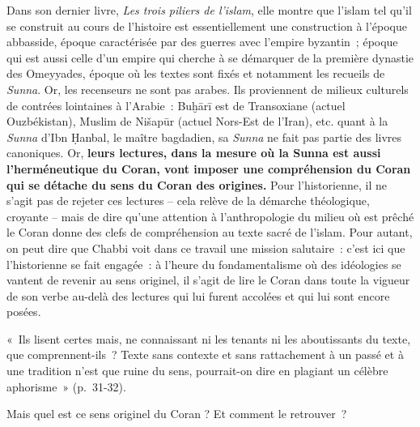 Dans son dernier livre, \emph{Les trois piliers de l'islam}, elle montre
que l'islam tel qu'il se construit au cours de l'histoire est
essentiellement une construction à l'époque abbasside, époque
caractérisée par des guerres avec l'empire byzantin~; époque qui est
aussi celle d'un empire qui cherche à se démarquer de la première
dynastie des Omeyyades, époque où les textes sont fixés et notamment les
recueils de \emph{Sunna}. Or, les recenseurs ne sont pas arabes. Ils
proviennent de milieux culturels de contrées lointaines à l'Arabie~:
Buḫārī est de Transoxiane (actuel Ouzbékistan), Muslim de Nišapūr
(actuel Nors-Est de l'Iran), etc. quant à la \emph{Sunna} d'Ibn Ḥanbal,
le maître bagdadien, sa \emph{Sunna} ne fait pas partie des livres
canoniques. Or, \textbf{leurs lectures, dans la
mesure où la Sunna est aussi l'herméneutique du Coran, vont imposer une
compréhension du Coran qui se détache du sens du Coran des origines.}
Pour l'historienne, il ne s'agit pas de rejeter ces lectures -- cela
relève de la démarche théologique, croyante -- mais de dire qu'une
attention à l'anthropologie du milieu où est prêché le Coran donne des
clefs de compréhension au texte sacré de l'islam. Pour autant, on peut
dire que Chabbi voit dans ce travail une mission salutaire~: c'est ici
que l'historienne se fait engagée~: à l'heure du fondamentalisme où des
idéologies se vantent de revenir au sens originel, il s'agit de lire le
Coran dans toute la vigueur de son verbe au-delà des lectures qui lui
furent accolées et qui lui sont encore posées.

«~Ils lisent certes mais, ne connaissant ni les tenants ni les
aboutissants du texte, que comprennent-ils~? Texte sans contexte et sans
rattachement à un passé et à une tradition n'est que ruine du sens,
pourrait-on dire en plagiant un célèbre aphorisme~» (p.~31-32).

Mais quel est ce sens originel du Coran ? Et comment le retrouver~?

